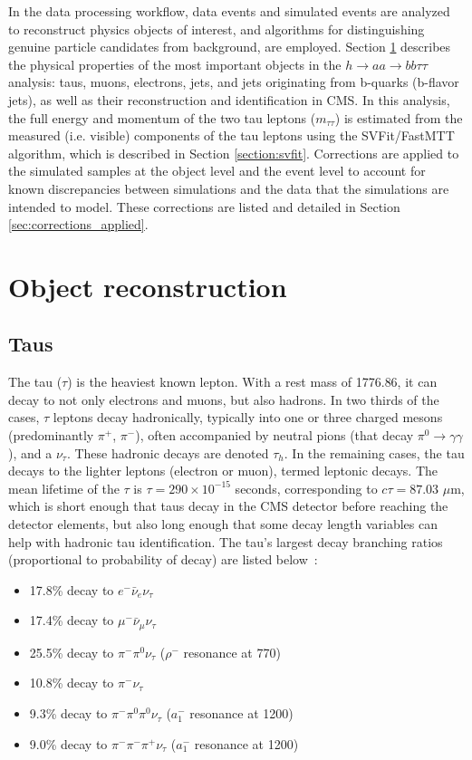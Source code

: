 In the data processing workflow, data events and simulated events are analyzed to reconstruct physics objects of interest, and algorithms for distinguishing genuine particle candidates from background, are employed. Section \ref{sec:object-reconstruction} describes the physical properties of the most important objects in the $h \rightarrow aa \rightarrow bb\tau\tau$ analysis: taus, muons, electrons, jets, and jets originating from b-quarks (b-flavor jets), as well as their reconstruction and identification in CMS. In this analysis, the full energy and momentum of the two tau leptons ($m_{\tau\tau}$) is estimated from the measured (i.e. visible) components of the tau leptons using the SVFit/FastMTT algorithm, which is described in Section \ref{section:svfit}. Corrections are applied to the simulated samples at the object level and the event level to account for known discrepancies between simulations and the data that the simulations are intended to model. These corrections are listed and detailed in Section \ref{sec:corrections_applied}.

\section{Object reconstruction}
\label{sec:object-reconstruction}
\subsection{Taus}
\label{section:taus}
The tau ($\tau$) is the heaviest known lepton. With a rest mass of 1776.86\MeV, it can decay to not only electrons and muons, but also hadrons. In two thirds of the cases, $\tau$ leptons decay hadronically, typically into one or three charged mesons (predominantly $\pi^+$, $\pi^-$), often accompanied by neutral pions (that decay $\pi^0 \rightarrow \gamma\gamma$), and a $\nu_{\tau}$. These hadronic decays are denoted $\tau_{h}$. In the remaining cases, the tau decays to the lighter leptons (electron or muon), termed leptonic decays. The mean lifetime of the $\tau$ is $\tau = 290 \times 10^{-15}$ seconds, corresponding to $c\tau = 87.03$ $\mu$m, which is short enough that taus decay in the CMS detector before reaching the detector elements, but also long enough that some decay length variables can help with hadronic tau identification. The tau's largest decay branching ratios (proportional to probability of decay) are listed below~\citep{workman_review_2022}: 
\begin{itemize}
    \item 17.8\% decay to $e^- \bar{\nu}_e \nu_{\tau}$
    \item 17.4\% decay to $\mu^- \bar{\nu}_\mu \nu_{\tau}$
    \item 25.5\% decay to $\pi^- \pi^0 \nu_{\tau}$ ($\rho^-$ resonance at 770\MeV)
    \item 10.8\% decay to $\pi^- \nu_{\tau}$ %
    \item 9.3\% decay to $\pi^- \pi^0 \pi^0 \nu_{\tau}$  ($a_1^-$ resonance at 1200\MeV)
    \item 9.0\% decay to $\pi^- \pi^- \pi^+ \nu_{\tau}$ ($a_1^-$ resonance at 1200\MeV)
\end{itemize}

